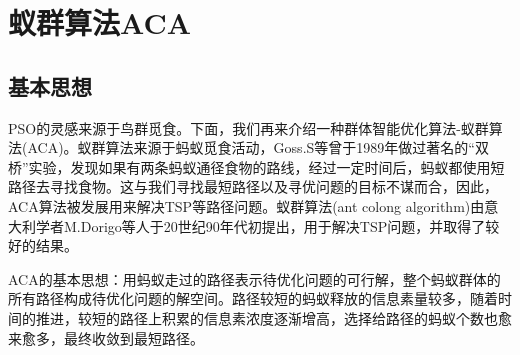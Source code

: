 \section{蚁群算法ACA}
    \subsection{基本思想}
        \par
        PSO的灵感来源于鸟群觅食。下面，我们再来介绍一种群体智能优化算法-蚁群算法(ACA)。蚁群算法来源于蚂蚁觅食活动，Goss.S等曾于1989年做过著名的“双桥”实验，发现如果有两条蚂蚁通径食物的路线，经过一定时间后，蚂蚁都使用短路径去寻找食物。这与我们寻找最短路径以及寻优问题的目标不谋而合，因此，ACA算法被发展用来解决TSP等路径问题。蚁群算法(ant colong algorithm)由意大利学者M.Dorigo等人于20世纪90年代初提出，用于解决TSP问题，并取得了较好的结果。
        \par
        ACA的基本思想：用蚂蚁走过的路径表示待优化问题的可行解，整个蚂蚁群体的所有路径构成待优化问题的解空间。路径较短的蚂蚁释放的信息素量较多，随着时间的推进，较短的路径上积累的信息素浓度逐渐增高，选择给路径的蚂蚁个数也愈来愈多，最终收敛到最短路径。
